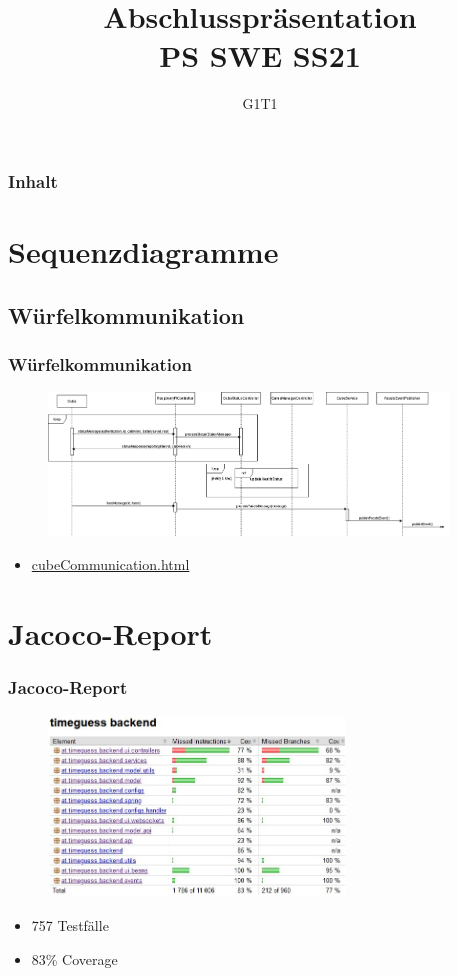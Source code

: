 \documentclass[hyperref={pdfpagelabels=false}, xcolor=dvipsnames]{beamer}
\title{\textbf{Abschlusspräsentation} \\
        \large PS SWE SS21}
\author{G1T1}
\begin{document}
\maketitle

\begin{frame}
\pagecolor{JungleGreen!10}
\frametitle{Inhalt}
\tableofcontents
\end{frame}

\section{Sequenzdiagramme}
\subsection{Würfelkommunikation}
\begin{frame}
\frametitle{Würfelkommunikation}
\begin{figure}[H]\centering
  \includegraphics[height=1.5in]{cube0.png}
\end{figure}
\begin{itemize}
  \item \href{file:///C:/Users/cubeCommunication.html}{cubeCommunication.html}
\end{itemize}
\end{frame}

\section{Jacoco-Report}
\begin{frame}
\frametitle{Jacoco-Report}
\begin{figure}[H]\centering
  \includegraphics[height=1.9in]{jacoco}
\end{figure}
\begin{itemize}
  \item 757 Testfälle
  \item 83\% Coverage 
\end{itemize}
\end{frame}
\end{document}
